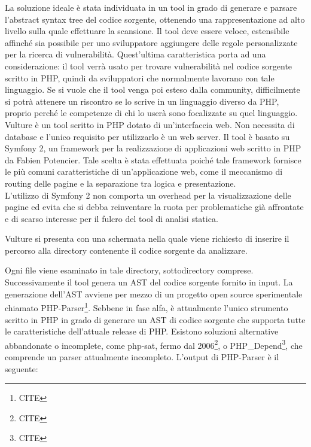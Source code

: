 La soluzione ideale è stata individuata in un tool in grado di generare e parsare l'abstract syntax tree del codice sorgente, ottenendo una rappresentazione ad alto livello sulla quale effettuare la scansione. Il tool deve essere veloce, estensibile affinché sia possibile per uno sviluppatore aggiungere delle regole personalizzate per la ricerca di vulnerabilità. Quest'ultima caratteristica porta ad una considerazione: il tool verrà usato per trovare vulnerabilità nel codice sorgente scritto in PHP, quindi da sviluppatori che normalmente lavorano con tale linguaggio. Se si vuole che il tool venga poi esteso dalla community, difficilmente si potrà attenere un riscontro se lo scrive in un linguaggio diverso da PHP, proprio perché le competenze di chi lo userà sono focalizzate su quel linguaggio.\\

Vulture è un tool scritto in PHP dotato di un'interfaccia web. Non necessita di database e l'unico requisito per utilizzarlo è un web server. Il tool è basato su Symfony 2, un framework per la realizzazione di applicazioni web scritto in PHP da Fabien Potencier. Tale scelta è stata effettuata poiché tale framework fornisce le più comuni caratteristiche di un'applicazione web, come il meccanismo di routing delle pagine e la separazione tra logica e presentazione.\\
L'utilizzo di Symfony 2 non comporta un overhead per la visualizzazione delle pagine ed evita che si debba reinventare la ruota per problematiche già affrontate e di scarso interesse per il fulcro del tool di analisi statica.

Vulture si presenta con una schermata nella quale viene richiesto di inserire il percorso alla directory contenente il codice sorgente da analizzare. 

\cite{IMMAGINE VULTURE INIZIALE}

Ogni file viene esaminato in tale directory, sottodirectory comprese.\\
Successivamente il tool genera un AST del codice sorgente fornito in input. La generazione dell'AST avviene per mezzo di un progetto open source sperimentale chiamato PHP-Parser\footnote{CITE}. Sebbene in fase alfa, è attualmente l'unico strumento scritto in PHP in grado di generare un AST di codice sorgente che supporta tutte le caratteristiche dell'attuale release di PHP. Esistono soluzioni alternative abbandonate o incomplete, come php-sat, fermo dal 2006\footnote{CITE}, o PHP\_Depend\footnote{CITE}, che comprende un parser attualmente incompleto.
L'output di PHP-Parser è il seguente:

